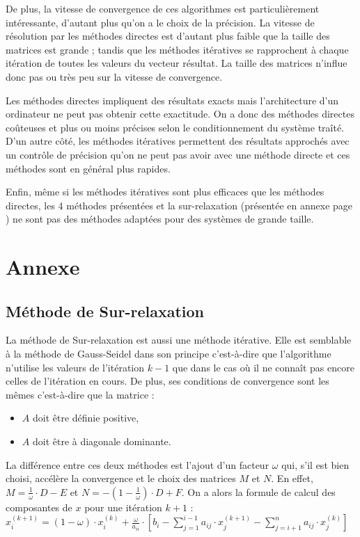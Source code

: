\documentclass{report}
\begin{document}
    De plus, la vitesse de convergence de ces algorithmes est particulièrement intéressante, d'autant plus qu'on a le choix de la précision. La vitesse de résolution par les méthodes directes est d'autant plus faible que la taille des matrices est grande ; tandis que les méthodes itératives se rapprochent à chaque itération de toutes les valeurs du vecteur résultat. La taille des matrices n'influe donc pas ou très peu sur la vitesse de convergence.

    Les méthodes directes impliquent des résultats exacts mais l'architecture d'un ordinateur ne peut pas obtenir cette exactitude. On a donc des méthodes directes coûteuses et plus ou moins précises selon le conditionnement du système traîté. D'un autre côté, les méthodes itératives permettent des résultats approchés avec un contrôle de précision qu'on ne peut pas avoir avec une méthode directe et ces méthodes sont en général plus rapides.

    Enfin, même si les méthodes itératives sont plus efficaces que les méthodes directes, les 4 méthodes présentées et la sur-relaxation (présentée en annexe page \pageref{surrelaxation}) ne sont pas des méthodes adaptées pour des systèmes de grande taille.
    \newpage
  \chapter{Annexe}
    \section{Méthode de Sur-relaxation}
    La méthode de Sur-relaxation est aussi une méthode itérative. Elle est semblable à la méthode de Gauss-Seidel dans son principe c'est-à-dire que l'algorithme n'utilise les valeurs de l'itération $k-1$ que dans le cas où il ne connaît pas encore celles de l'itération en cours.
    \newline
    De plus, ses conditions de convergence sont les mêmes c'est-à-dire que la matrice :
          \begin{itemize}
        \item{$A$ doit être définie positive,}
        \item{$A$ doit être à diagonale dominante.}
      \end{itemize}
    La différence entre ces deux méthodes est l'ajout d'un facteur $ \omega $ qui, s'il est bien choisi, accélère la convergence et le choix des matrices $M$ et $N$. 
    \newline
    En effet, $M = \frac{1}{\omega} \cdot D - E$ et $N = - \left( 1- \frac{1}{\omega} \right) \cdot D + F $.
    \newline
    On a alors la formule de calcul des composantes de $x$ pour une itération $k+1$ :
    \newline
    $x_{i}^{(k+1)} = (1 - \omega) \cdot x_{i}^{(k)} +  \frac{\omega}{a_{ii}} \cdot \left [ b_{i} - \sum_{j=1}^{i-1} a_{ij} \cdot x_{j}^{(k+1)} - \sum_{j=i+1}^{n} a_{ij} \cdot x_{j}^{(k)} \right ] $
      \newline
\end{document}
